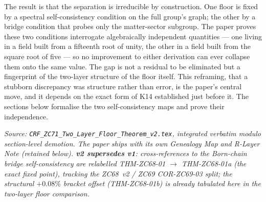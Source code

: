 \documentclass[12pt, a4paper]{article}
\begin{document}
The result is that the separation is irreducible by construction. One floor is
fixed by a spectral self-consistency condition on the full group's graph; the
other by a bridge condition that probes only the matter-sector subgroup. The
paper proves these two conditions interrogate algebraically independent
quantities --- one living in a field built from a fifteenth root of unity, the
other in a field built from the square root of five --- so no improvement to
either derivation can ever collapse them onto the same value. The gap is not a
residual to be eliminated but a fingerprint of the two-layer structure of the
floor itself. This reframing, that a stubborn discrepancy was structure rather
than error, is the paper's central move, and it depends on the exact form of
K14 established just before it. The sections below formalise the two
self-consistency maps and prove their independence.
\label{sec:zc71}

\noindent
\textit{Source: \texttt{CRF\_ZC71\_Two\_Layer\_Floor\_Theorem\_v2.tex}, integrated verbatim modulo
section-level demotion. The paper ships with its own Genealogy Map
and R-Layer Note (retained below).
\textbf{v2 supersedes v1}: cross-references to the Born-chain bridge
self-consistency are relabelled THM-ZC68-01 $\to$ THM-ZC68-01a (the exact
fixed point), tracking the ZC68~v2 / ZC69 COR-ZC69-03 split; the structural
$+0.08\%$ bracket offset (THM-ZC68-01b) is already tabulated here in the
two-layer floor comparison.}

\medskip

\sloppy

\end{document}
